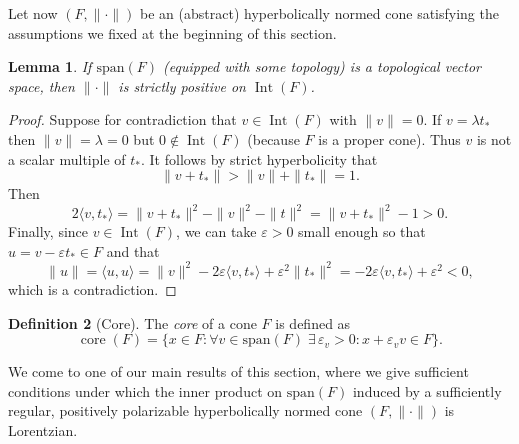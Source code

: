 \documentclass[a4paper,11pt]{article}
\numberwithin{equation}{section}
\theoremstyle{definition}
\newtheorem{Definition}{Definition}[section]
\theoremstyle{plain}
\newtheorem{Lemma}[Definition]{Lemma}
\newcommand{\spn}{\mathrm{span}}
\DeclareMathOperator{\core}{\text{core}}
\DeclareMathOperator{\Int}{Int}
\let\epsilon\varepsilon
\newcommand{\inner}[2]{\langle #1, #2 \rangle}
\newcommand{\norm}[1]{\| #1\|}
\begin{document}
Let now $(F,\norm{\cdot})$ be an (abstract) hyperbolically normed cone satisfying the assumptions we fixed at the beginning of this section.

\begin{Lemma}\label{Lemma: positive on interior}
    If $\spn(F)$ (equipped with some topology) is a topological vector space, then $\norm{\cdot}$ is strictly positive on $\Int(F)$.
\end{Lemma}

\begin{proof}
    Suppose for contradiction that $v \in \Int(F)$ with $\norm{v} = 0$. If $v = \lambda t_{*}$ then $\norm{v} = \lambda = 0$ but $0 \notin \Int(F)$ (because $F$ is a proper cone). Thus $v$ is not a scalar multiple of $t_{*}$. It follows by strict hyperbolicity that
    $$\norm{v + t_{*}} > \norm{v} + \norm{t_{*}} = 1.$$
    Then
    $$2\inner{v}{t_{*}} = \norm{v + t_{*}}^{2} - \norm{v}^{2} - \norm{t}^2 = \norm{v + t_{*}}^{2} - 1 > 0.$$
    Finally, since $v \in \Int(F)$, we can take $\varepsilon > 0$ small enough so that $u = v - \varepsilon t_{*} \in F$ and that 
    $$\norm{u} = \inner{u}{u} = \norm{v}^{2} - 2\varepsilon\inner{v}{t_{*}} + \varepsilon^{2}\norm{t_{*}}^{2} = -2\varepsilon \inner{v}{t_{*}} + \varepsilon^{2} < 0,$$
    which is a contradiction.
\end{proof}

\begin{Definition}[Core]
    The \textit{core} of a cone $F$ is defined as
    $$\core(F) = \{x \in F: \forall v \in \spn(F)\; \exists \, \epsilon_{v} > 0 : x + \epsilon_{v}v \in F\}.$$
\end{Definition}

We come to one of our main results of this section, where we give sufficient conditions under which the inner product on $\spn(F)$ induced by a sufficiently regular, positively polarizable hyperbolically normed cone $(F,\norm{\cdot})$ is Lorentzian.
\end{document}
